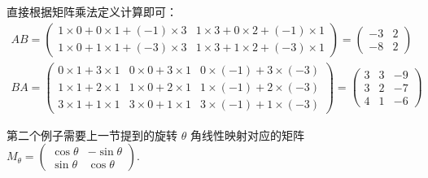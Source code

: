 \begin{solution}
    直接根据矩阵乘法定义计算即可：
    \begin{gather*}
        AB = \begin{pmatrix}
            1 \times 0 + 0 \times 1 + (-1) \times 3 & 1 \times 3 + 0 \times 2 + (-1) \times 1 \\
            1 \times 0 + 1 \times 1 + (-3) \times 3 & 1 \times 3 + 1 \times 2 + (-3) \times 1
        \end{pmatrix} = \begin{pmatrix}
                -3 & 2 \\
                -8 & 2
            \end{pmatrix} \\
        BA = \begin{pmatrix}
            0 \times 1 + 3 \times 1 & 0 \times 0 + 3 \times 1 & 0 \times (-1) + 3 \times (-3) \\
            1 \times 1 + 2 \times 1 & 1 \times 0 + 2 \times 1 & 1 \times (-1) + 2 \times (-3) \\
            3 \times 1 + 1 \times 1 & 3 \times 0 + 1 \times 1 & 3 \times (-1) + 1 \times (-3)
        \end{pmatrix} = \begin{pmatrix}
                3 & 3 & -9 \\
                3 & 2 & -7 \\
                4 & 1 & -6
            \end{pmatrix}
    \end{gather*}
\end{solution}

第二个例子需要上一节提到的旋转 $\theta$ 角线性映射对应的矩阵 $M_{\theta}=\begin{pmatrix}
        \cos\theta & -\sin\theta \\
        \sin\theta & \cos\theta
\end{pmatrix}$.

